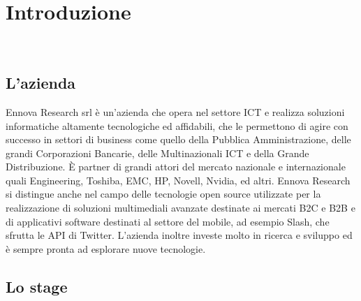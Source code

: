 
\chapter{Introduzione}
\label{cap:introduzione}

\\

%
%

\section{L'azienda}

Ennova Research srl è un’azienda che opera nel settore \gls{ICT} e realizza soluzioni
informatiche altamente tecnologiche ed affidabili, che le permettono di agire con
successo in settori di business come quello della Pubblica Amministrazione, delle grandi
Corporazioni Bancarie, delle Multinazionali \gls{ICT} e della Grande Distribuzione.
È partner di grandi attori del mercato nazionale e internazionale quali Engineering,
Toshiba, EMC, HP, Novell, Nvidia, ed altri.
Ennova Research si distingue anche nel campo delle tecnologie open source utilizzate per la
realizzazione di soluzioni multimediali avanzate destinate ai mercati \gls{B2C} e \gls{B2B} e di
applicativi software destinati al settore del mobile, ad esempio Slash, che sfrutta le \gls{API} di Twitter.
L'azienda inoltre investe molto in ricerca e sviluppo ed è sempre pronta ad esplorare nuove tecnologie.

\section{Lo stage}

